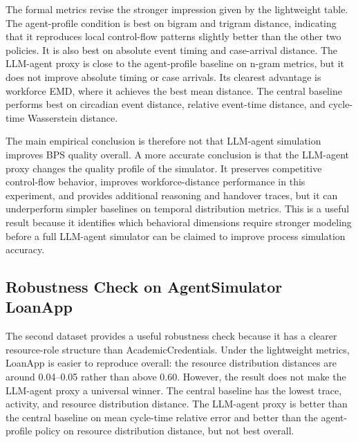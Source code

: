 The formal metrics revise the stronger impression given by the
lightweight table. The agent-profile condition is best on bigram and
trigram distance, indicating that it reproduces local control-flow
patterns slightly better than the other two policies. It is also best on
absolute event timing and case-arrival distance. The LLM-agent proxy is
close to the agent-profile baseline on n-gram metrics, but it does not
improve absolute timing or case arrivals. Its clearest advantage is
workforce EMD, where it achieves the best mean distance. The central
baseline performs best on circadian event distance, relative event-time
distance, and cycle-time Wasserstein distance.

The main empirical conclusion is therefore not that LLM-agent simulation
improves BPS quality overall. A more accurate conclusion is that the
LLM-agent proxy changes the quality profile of the simulator. It
preserves competitive control-flow behavior, improves workforce-distance
performance in this experiment, and provides additional reasoning and
handover traces, but it can underperform simpler baselines on temporal
distribution metrics. This is a useful result because it identifies
which behavioral dimensions require stronger modeling before a full
LLM-agent simulator can be claimed to improve process simulation
accuracy.

\subsection{Robustness Check on AgentSimulator
LoanApp}\label{robustness-check-on-agentsimulator-loanapp}

The second dataset provides a useful robustness check because it has a
clearer resource-role structure than AcademicCredentials. Under the
lightweight metrics, LoanApp is easier to reproduce overall: the
resource distribution distances are around 0.04--0.05 rather than above
0.60. However, the result does not make the LLM-agent proxy a universal
winner. The central baseline has the lowest trace, activity, and
resource distribution distance. The LLM-agent proxy is better than the
central baseline on mean cycle-time relative error and better than the
agent-profile policy on resource distribution distance, but not best
overall.

